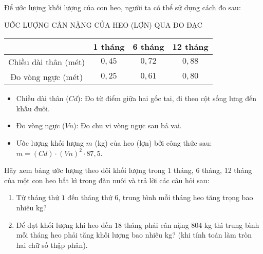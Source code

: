 \begin{bt}%
	Để ước lượng khối lượng của con heo, người ta có thể sử dụng cách đo sau:
	\begin{center}
		ƯỚC LƯỢNG CÂN NẶNG CỦA HEO (LỢN) QUA ĐO ĐẠC\\
		{\renewcommand\arraystretch{1.5} %
			\begin{tabular}[t]{|c|c|c|c|}
				\hline
				&  1 tháng
				&  6 tháng
				&  12 tháng\\
				\hline
				Chiều dài thân (mét)
				& $0{,}45$	
				& $0{,}72$
				& $0{,}88$ \\
				\hline
				Đo vòng ngực (mét)
				& $0{,}25$
				& $0{,}61$
				& $0{,}80$ \\
				\hline
			\end{tabular}
		}
	\end{center}
	\begin{itemize}
		\item Chiều dài thân ($Cd$): Đo từ điểm giữa hai gốc tai, đi theo cột sống lưng đến khấu đuôi.
		\item Đo vòng ngực ($Vn$): Đo chu vi vòng ngực sau bả vai.
		\item Ước lượng khối lượng $m$ (kg) của heo (lợn) bởi công thức sau:
		$m= (Cd)\cdot (Vn)^2\cdot 87{,}5$.
	\end{itemize}	 	
	Hãy xem bảng ước lượng theo dõi khối lượng trong 1 tháng, 6 tháng, 12 tháng của một con heo bất kì trong đàn nuôi và trả lời các câu hỏi sau:
	\begin{enumerate}
		\item Từ tháng thứ $1$ đến tháng thứ $6$, trung bình mỗi tháng heo tăng trọng bao nhiêu kg?
		\item Để đạt khối lượng khi heo đến $18$ tháng phải cân nặng $804$ kg thì trung bình mỗi tháng heo phải tăng khối lượng bao nhiêu kg?
		(khi tính toán làm tròn hai chữ số thập phân).
	\end{enumerate}	
\end{bt}

